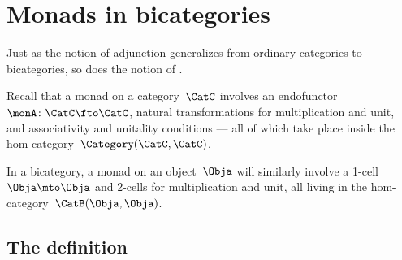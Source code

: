 
\section{Monads in bicategories}
\label{sec:bicats-monads}


Just as the notion of adjunction generalizes from ordinary categories to bicategories, so does the notion of .

Recall that a monad on a category~$\CatC$ involves an endofunctor~$\monA \colon \CatC \fto \CatC$, natural transformations for multiplication and unit, and associativity and unitality conditions --- all of which take place inside the hom-category~$\Category(\CatC, \CatC)$.

In a bicategory, a monad on an object~$\Obja$ will similarly involve a 1-cell~$\Obja \mto \Obja$ and 2-cells for multiplication and unit, all living in the hom-category~$\CatB(\Obja, \Obja)$.


\subsection{The definition}

